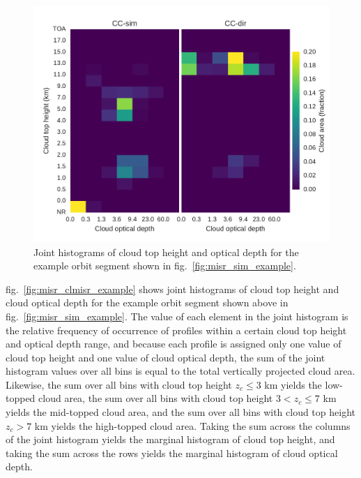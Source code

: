 \begin{figure}[htbp]
\centering
\includegraphics{graphics/misr_clmisr_example.pdf}
\caption{\label{fig:misr_clmisr_example}Joint histograms of cloud top
height and optical depth for the example orbit segment shown in
fig.~\ref{fig:misr_sim_example}.}\label{fig:misrux5fclmisrux5fexample}
\end{figure}

fig.~\ref{fig:misr_clmisr_example} shows joint histograms of cloud top
height and cloud optical depth for the example orbit segment shown above
in fig.~\ref{fig:misr_sim_example}. The value of each element in the
joint histogram is the relative frequency of occurrence of profiles
within a certain cloud top height and optical depth range, and because
each profile is assigned only one value of cloud top height and one
value of cloud optical depth, the sum of the joint histogram values over
all bins is equal to the total vertically projected cloud area.
Likewise, the sum over all bins with cloud top height \(z_c \le 3\) km
yields the low-topped cloud area, the sum over all bins with cloud top
height \(3 < z_c \le 7\) km yields the mid-topped cloud area, and the
sum over all bins with cloud top height \(z_c > 7\) km yields the
high-topped cloud area. Taking the sum across the columns of the joint
histogram yields the marginal histogram of cloud top height, and taking
the sum across the rows yields the marginal histogram of cloud optical
depth.

